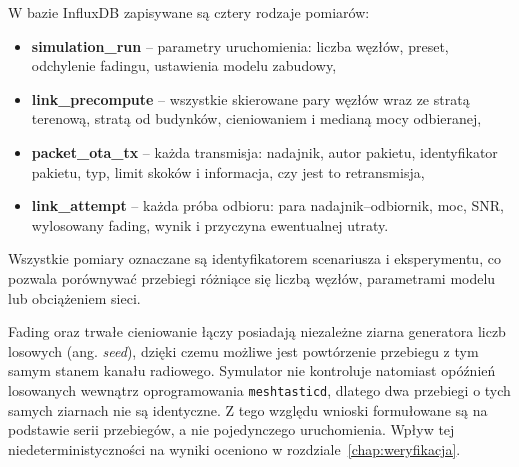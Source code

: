 W bazie InfluxDB zapisywane są cztery rodzaje pomiarów:

\begin{itemize}
\item \textbf{simulation\_run} -- parametry uruchomienia: liczba węzłów, preset, odchylenie fadingu, ustawienia modelu zabudowy,
\item \textbf{link\_precompute} -- wszystkie skierowane pary węzłów wraz ze stratą terenową, stratą od budynków, cieniowaniem i medianą mocy odbieranej,
\item \textbf{packet\_ota\_tx} -- każda transmisja: nadajnik, autor pakietu, identyfikator pakietu, typ, limit skoków i informacja, czy jest to retransmisja,
\item \textbf{link\_attempt} -- każda próba odbioru: para nadajnik--odbiornik, moc, SNR, wylosowany fading, wynik i przyczyna ewentualnej utraty.
\end{itemize}

Wszystkie pomiary oznaczane są identyfikatorem scenariusza i eksperymentu, co pozwala porównywać przebiegi różniące się liczbą węzłów, parametrami modelu lub obciążeniem sieci.

Fading oraz trwałe cieniowanie łączy posiadają niezależne ziarna generatora liczb losowych (ang. \textit{seed}), dzięki czemu możliwe jest powtórzenie przebiegu z tym samym stanem kanału radiowego. Symulator nie kontroluje natomiast opóźnień losowanych wewnątrz oprogramowania \texttt{meshtasticd}, dlatego dwa przebiegi o tych samych ziarnach nie są identyczne. Z tego względu wnioski formułowane są na podstawie serii przebiegów, a nie pojedynczego uruchomienia. Wpływ tej niedeterministyczności na wyniki oceniono w rozdziale~\ref{chap:weryfikacja}.
